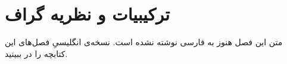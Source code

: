 \chapter{ترکیبیات و نظریه گراف}
\label{ch:06-combinatorics-and-graph-theory-fa-01}

متن این فصل هنوز به فارسی نوشته نشده است. نسخه‌ی انگلیسیِ فصل‌های این کتابچه را در  ببینید.
